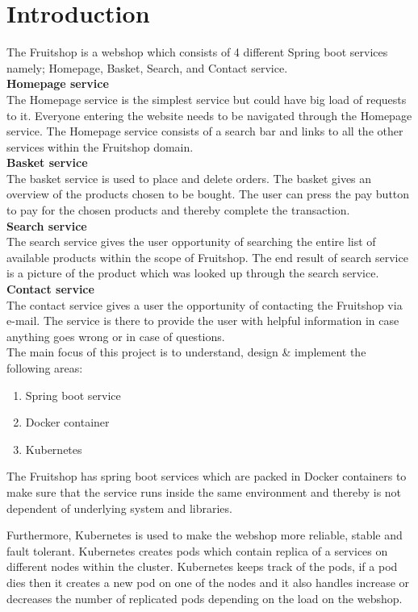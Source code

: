 \chapter{Introduction}\label{ch:introduction}

The Fruitshop is a webshop which consists of 4 different Spring boot services namely; Homepage, Basket, Search, and Contact service.\\ 


\textbf{Homepage service}\\
The Homepage service is the simplest service but could have big load of requests to it. Everyone entering the website needs to be navigated through the Homepage service. 
The Homepage service consists of a search bar and links to all the other services within the Fruitshop domain.\\ 

\textbf{Basket service }\\
The basket service is used to place and delete orders. The basket gives an overview of the products chosen to be bought. The user can press the pay button to pay for the chosen products and thereby complete the transaction.\\ 

\textbf{Search service }\\
The search service gives the user opportunity of searching the entire list of available products within the scope of Fruitshop. The end result of search service is a picture of the product which was looked up through the search service.\\   

\textbf{Contact service}\\
The contact service gives a user the opportunity of contacting the Fruitshop via e-mail. The service is there to provide the user with helpful information in case anything goes wrong or in case of questions.\\

The main focus of this project is to understand, design \& implement the following areas:  

\begin{enumerate}
	\item Spring boot service
	\item Docker container
	\item Kubernetes
\end{enumerate}

The Fruitshop has spring boot services which are packed in Docker containers to make sure that the service runs inside the same environment and thereby is not dependent of underlying system and libraries. 

Furthermore, Kubernetes is used to make the webshop more reliable, stable and fault tolerant. Kubernetes creates pods which contain replica of a services on different nodes within the cluster. Kubernetes keeps track of the pods, if a pod dies then it creates a new pod on one of the nodes and it also handles increase or decreases the number of replicated pods depending on the load on the webshop. 





